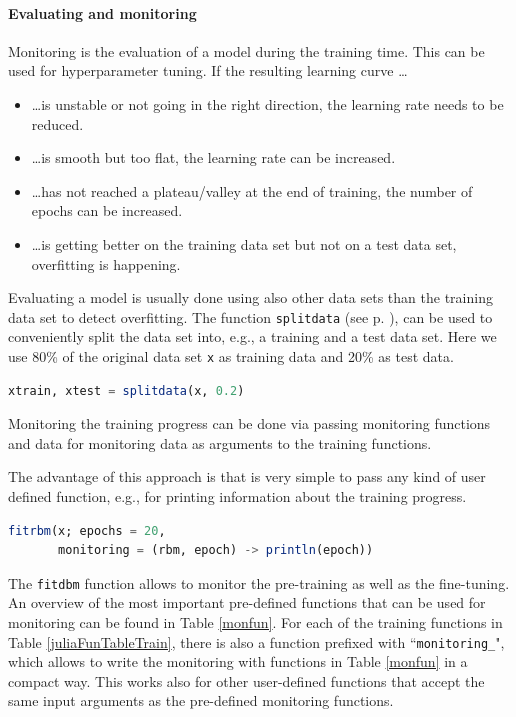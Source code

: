 \documentclass[12pt]{article}
\newcommand{\inlinecode}[1]{\texttt{#1}}
\begin{document}
\paragraph{Evaluating and monitoring}\label{monitoring}

Monitoring is the evaluation of a model during the training time.
This can be used for hyperparameter tuning.
If the resulting learning curve \citep{ml_encyclopedia} \dots
\begin{itemize}
\item \dots is unstable or not going in the right direction, the learning rate needs to be reduced.
\item \dots is smooth but too flat, the learning rate can be increased.
\item \dots has not reached a plateau/valley at the end of training, the number of epochs can be increased.
\item \dots is getting better on the training data set but not on a test data set, overfitting is happening.
\end{itemize}

Evaluating a model is usually done using also other data sets than the training data set to detect overfitting.
The function \inlinecode{splitdata} (see p. \pageref{bms_splitdata}), can be used to conveniently split the data set into, e.g., a training and a test data set.
Here we use 80\%  of the original data set \inlinecode{x} as training data and 20\% as test data.

\begin{lstlisting}[language=Julia]
xtrain, xtest = splitdata(x, 0.2)
\end{lstlisting}

Monitoring the training progress can be done via passing monitoring functions and data for monitoring data as arguments to the training functions.

The advantage of this approach is that is very simple to pass any kind of user defined function, e.g., for printing information about the training progress.
\begin{lstlisting}[language=Julia]
fitrbm(x; epochs = 20,
       monitoring = (rbm, epoch) -> println(epoch))
\end{lstlisting}

The \inlinecode{fitdbm} function allows to monitor the pre-training as well as the fine-tuning.
An overview of the most important pre-defined functions that can be used for monitoring can be found in Table \ref{monfun}.
For each of the training functions in Table \ref{juliaFunTableTrain}, there is also a function prefixed with ``\inlinecode{monitoring\_}", which allows to write the monitoring with functions in Table \ref{monfun} in a compact way.
This works also for other user-defined functions that accept the same input arguments as the pre-defined monitoring functions.
\end{document}
